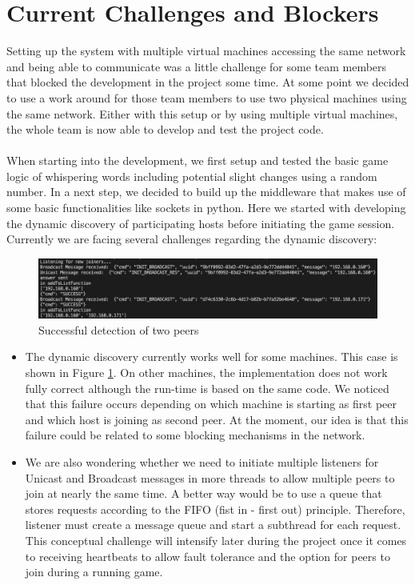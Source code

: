 \documentclass[runningheads]{llncs}
\begin{document}
\section{Current Challenges and Blockers}\label{challenges}
    Setting up the system with multiple virtual machines accessing the same network and being able to communicate was a little challenge for some team members that blocked the development in the project some time. At some point we decided to use a work around for those team members to use two physical machines using the same network. Either with this setup or by using multiple virtual machines, the whole team is now able to develop and test the project code.
    \\\\
    When starting into the development, we first setup and tested the basic game logic of whispering words including potential slight changes using a random number. In a next step, we decided to build up the middleware that makes use of some basic functionalities like sockets in python. Here we started with developing the dynamic discovery of participating hosts before initiating the game session. Currently we are facing several challenges regarding the dynamic discovery:
    
    \begin{figure}[h]
        \includegraphics[width=\textwidth]{Dynamic_Discovery_Output.png}
        \caption{Successful detection of two peers} \label{fig:dynamic_discovery_output}
    \end{figure}
    
    \begin{itemize}[label=$\bullet$]
    
    \item  The dynamic discovery currently works well for some machines. This case is shown in Figure \ref{fig:dynamic_discovery_output}. On other machines, the implementation does not work fully correct although the run-time is based on the same code. We noticed that this failure occurs depending on which machine is starting as first peer and which host is joining as second peer. At the moment, our idea is that this failure could be related to some blocking mechanisms in the network.\\
    
    \item We are also wondering whether we need to initiate multiple listeners for Unicast and Broadcast messages in more threads to allow multiple peers to join at nearly the same time. A better way would be to use a queue that stores requests according to the FIFO (fist in - first out) principle. Therefore, listener must create a message queue and start a subthread for each request. This conceptual challenge will intensify later during the project once it comes to receiving heartbeats to allow fault tolerance and the option for peers to join during a running game.\\
    
    \end{itemize}
\end{document}
